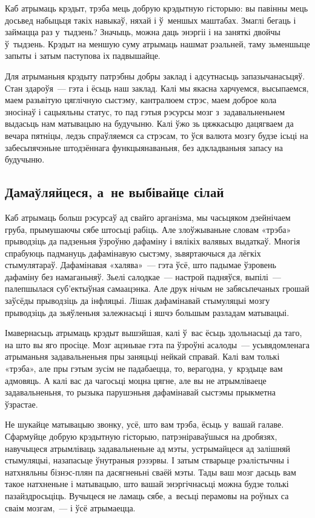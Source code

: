 Каб атрымаць крэдыт, трэба мець добрую крэдытную гісторыю: вы павінны мець досьвед набыцьця такіх навыкаў, няхай і ў~меншых маштабах. Змаглі бегаць і займацца раз у~тыдзень? Значыць, можна даць энэргіі і на заняткі двойчы ў~тыдзень. Крэдыт на меншую суму атрымаць нашмат рэальней, таму зьменшыце запыты і затым паступова іх падвышайце.

Для атрыманьня крэдыту патрэбны добры заклад і адсутнасьць запазычанасьцяў. Стан здароўя~--- гэта і ёсьць наш заклад. Калі мы якасна харчуемся, высыпаемся, маем разьвітую цяглічную сыстэму, кантралюем стрэс, маем доброе кола зносінаў і сацыяльны статус, то пад гэтыя рэсурсы мозг з~задавальненьнем выдасьць нам матывацыю на будучыню. Калі ўжо зь цяжкасьцю дацягваем да вечара пятніцы, ледзь спраўляемся са стрэсам, то ўся валюта мозгу будзе ісьці на забесьпячэньне штодзённага функцыянаваньня, без адкладваньня запасу на будучыню.

\subsection*{Дамаўляйцеся, а~не выбівайце сілай}

Каб атрымаць больш рэсурсаў ад свайго арганізма, мы часьцяком дзейнічаем груба, прымушаючы сябе штосьці рабіць. Але злоўжываньне словам «трэба» прыводзіць да падзеньня ўзроўню дафаміну і вялікіх валявых выдаткаў. Многія спрабуюць падмануць дафамінавую сыстэму, зьвяртаючыся да лёгкіх стымулятараў. Дафамінавая «халява»~--- гэта ўсё, што падымае ўзровень дафаміну без намаганьняў. Зьелі салодкае~--- настрой падняўся, выпілі~--- палепшылася суб'ектыўная самаацэнка. Але друк нічым не забясьпечаных грошай заўсёды прыводзіць да інфляцыі. Лішак дафамінавай стымуляцыі мозгу прыводзіць да зьяўленьня залежнасьці і яшчэ большым разладам матывацыі.

Імавернасьць атрымаць крэдыт вышэйшая, калі ў~вас ёсьць здольнасьці да таго, на што вы яго просіце. Мозг ацэньвае гэта па ўзроўні асалоды~--- усьвядомленага атрыманьня задавальненьня пры заняцьці нейкай справай. Калі вам толькі «трэба», але пры гэтым зусім не падабаецца, то, верагодна, у~крэдыце вам адмовяць. А калі вас да чагосьці моцна цягне, але вы не атрымліваеце задавальненьня, то рызыка парушэньня дафамінавай сыстэмы прыкметна ўзрастае.

Не шукайце матывацыю звонку, усё, што вам трэба, ёсьць у~вашай галаве. Сфармуйце добрую крэдытную гісторыю, патрэніраваўшыся на дробязях, навучыцеся атрымліваць задавальненьне ад мэты, устрымайцеся ад залішняй стымуляцыі, назапасьце ўнутраныя рэзэрвы. І затым стварыце рэалістычны і натхняльны бізнэс-плян па дасягненьні сваёй мэты. Тады ваш мозг дасьць вам такое натхненьне і матывацыю, што вашай энэргічнасьці можна будзе толькі пазайздросьціць. Вучыцеся не ламаць сябе, а~весьці перамовы на роўных са сваім мозгам,~--- і ўсё атрымаецца.

